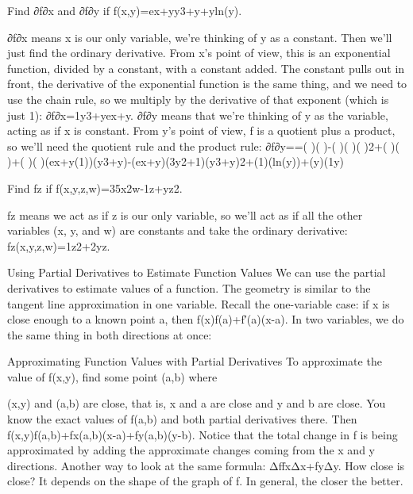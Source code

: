 \begin{example}
Find ∂f∂x and ∂f∂y if f(x,y)=ex+yy3+y+yln(y).

\begin{solution}
  ∂f∂x means x is our only variable, we're thinking of y as a constant. Then we'll just find the ordinary derivative. From x's point of view, this is an exponential function, divided by a constant, with a constant added. The constant pulls out in front, the derivative of the exponential function is the same thing, and we need to use the chain rule, so we multiply by the derivative of that exponent (which is just 1):
∂f∂x=1y3+yex+y.
∂f∂y means that we're thinking of y as the variable, acting as if x is constant. From y's point of view, f is a quotient plus a product, so we'll need the quotient rule and the product rule:
∂f∂y==( )( )-( )( )( )2+( )( )+( )( )(ex+y(1))(y3+y)-(ex+y)(3y2+1)(y3+y)2+(1)(ln(y))+(y)(1y)
\end{solution}\end{example}

\begin{example}
Find fz if f(x,y,z,w)=35x2w-1z+yz2.

\begin{solution}
  fz means we act as if z is our only variable, so we'll act as if all the other variables (x, y, and w) are constants and take the ordinary derivative:
fz(x,y,z,w)=1z2+2yz.
\end{solution}\end{example}

Using Partial Derivatives to Estimate Function Values
We can use the partial derivatives to estimate values of a function. The geometry is similar to the tangent line approximation in one variable. Recall the one-variable case: if x is close enough to a known point a, then
f(x)\approx   f(a)+f′(a)(x-a).
In two variables, we do the same thing in both directions at once:

Approximating Function Values with Partial Derivatives
To approximate the value of f(x,y), find some point (a,b) where

(x,y) and (a,b) are close, that is, x and a are close and y and b are close.
You know the exact values of f(a,b) and both partial derivatives there.
Then
f(x,y)\approx   f(a,b)+fx(a,b)(x-a)+fy(a,b)(y-b).
Notice that the total change in f is being approximated by adding the approximate changes coming from the x and y directions. Another way to look at the same formula:
Δf\approx   fxΔx+fyΔy.
How close is close? It depends on the shape of the graph of f. In general, the closer the better.

